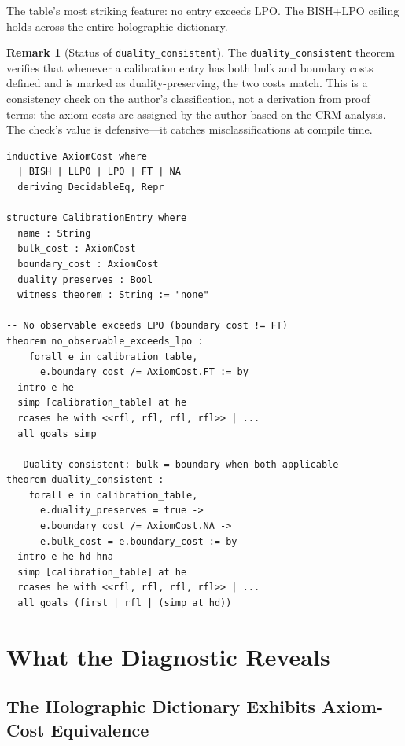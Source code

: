 \documentclass[11pt,a4paper]{article}
\theoremstyle{plain}
\theoremstyle{definition}
\newtheorem{remark}[theorem]{Remark}
\newcommand{\LPO}{\ensuremath{\mathrm{LPO}}}
\newcommand{\BISH}{\ensuremath{\mathrm{BISH}}}
\begin{document}
The table's most striking feature: no entry exceeds $\LPO$.
The $\BISH$+$\LPO$ ceiling holds across the entire holographic
dictionary.

\begin{remark}[Status of \texttt{duality\_consistent}]
The \texttt{duality\_consistent} theorem verifies that whenever
a calibration entry has both bulk and boundary costs defined and
is marked as duality-preserving, the two costs match.  This is a
consistency check on the author's classification, not a derivation
from proof terms: the axiom costs are assigned by the author based
on the CRM analysis.  The check's value is defensive---it catches
misclassifications at compile time.
\end{remark}

\begin{lstlisting}[caption={Calibration table verification: \texttt{CalibrationTable.lean}}]
inductive AxiomCost where
  | BISH | LLPO | LPO | FT | NA
  deriving DecidableEq, Repr

structure CalibrationEntry where
  name : String
  bulk_cost : AxiomCost
  boundary_cost : AxiomCost
  duality_preserves : Bool
  witness_theorem : String := "none"

-- No observable exceeds LPO (boundary cost != FT)
theorem no_observable_exceeds_lpo :
    forall e in calibration_table,
      e.boundary_cost /= AxiomCost.FT := by
  intro e he
  simp [calibration_table] at he
  rcases he with <<rfl, rfl, rfl, rfl>> | ...
  all_goals simp

-- Duality consistent: bulk = boundary when both applicable
theorem duality_consistent :
    forall e in calibration_table,
      e.duality_preserves = true ->
      e.boundary_cost /= AxiomCost.NA ->
      e.bulk_cost = e.boundary_cost := by
  intro e he hd hna
  simp [calibration_table] at he
  rcases he with <<rfl, rfl, rfl, rfl>> | ...
  all_goals (first | rfl | (simp at hd))
\end{lstlisting}

\section{What the Diagnostic Reveals}\label{sec:diagnostic}

\subsection{The Holographic Dictionary Exhibits Axiom-Cost Equivalence}
\end{document}
